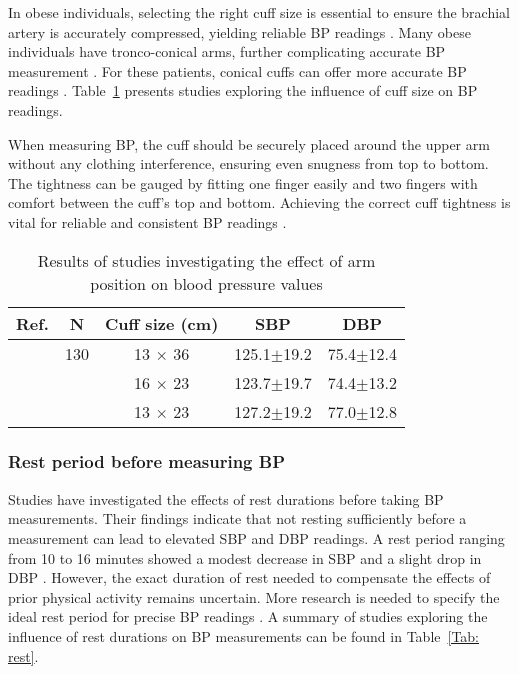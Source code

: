 \documentclass[journal,article,moreauthors]{Definitions/mdpi}
\begin{document}
In obese individuals, selecting the right cuff size is essential to ensure the brachial artery is accurately compressed, yielding reliable BP readings \citep{muntner2019measurement}. Many obese individuals have tronco-conical arms, further complicating accurate BP measurement \citep{Palatini2018}. For these patients, conical cuffs can offer more accurate BP readings \citep{muntner2019measurement}. Table~\ref{Tab: Cuff SIZE} presents studies exploring the influence of cuff size on BP readings.

When measuring BP, the cuff should be securely placed around the upper arm without any clothing interference, ensuring even snugness from top to bottom. The tightness can be gauged by fitting one finger easily and two fingers with comfort between the cuff's top and bottom. Achieving the correct cuff tightness is vital for reliable and consistent BP readings \citep{muntner2019measurement}.

\begin{table}[tb]
\caption{Results of studies investigating the effect of arm position on blood pressure values}\label{Tab: Cuff SIZE}
\begin{center}
\begin{tabular}{rcccc}
\toprule
\textbf{Ref.} & \textbf{N} &\textbf{Cuff size (cm)} & \textbf{SBP} & \textbf{DBP} \\
\hline
\citep{Bakx1997-pf} & 130  &  13 $\times$ 36 & 125.1$\pm$19.2 & 75.4$\pm$12.4\\ 
& &  16 $\times$ 23 & 123.7$\pm$19.7 & 74.4$\pm$13.2\\ 
&  &  13 $\times$ 23 & 127.2$\pm$19.2 & 77.0$\pm$12.8
\\
\bottomrule
\end{tabular}
\end{center}
\end{table}

\subsubsection{Rest period before measuring BP}
Studies have investigated the effects of rest durations before taking BP measurements. Their findings indicate that not resting sufficiently before a measurement can lead to elevated SBP and DBP readings. A rest period ranging from 10 to 16 minutes showed a modest decrease in SBP and a slight drop in DBP \citep{Nikolic2013, SALA2006}. However, the exact duration of rest needed to compensate the effects of prior physical activity remains uncertain. More research is needed to specify the ideal rest period for precise BP readings \citep{kallioinen2017sources}. A summary of studies exploring the influence of rest durations on BP measurements can be found in Table~\ref{Tab: rest}.
\end{document}
